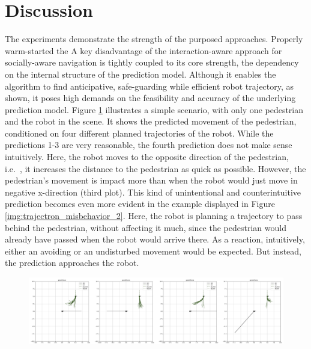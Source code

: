 \section{Discussion}
\label{text:experiments/discussion}
The experiments demonstrate the strength of the purposed approaches. Properly warm-started the   
\newline
A key disadvantage of the interaction-aware approach for socially-aware navigation is tightly coupled to its core strength, the dependency on the internal structure of the prediction model. Although it enables the algorithm to find anticipative, safe-guarding while efficient robot trajectory, as shown, it poses high demands on the feasibility and accuracy of the underlying prediction model. Figure \ref{img:trajectron_misbehavior} illustrates a simple scenario, with only one pedestrian and the robot in the scene. It shows the predicted movement of the pedestrian, conditioned on four different planned trajectories of the robot. While the predictions 1-3 are very reasonable, the fourth prediction does not make sense intuitively. Here, the robot moves to the opposite direction of the pedestrian, i.e.\ , it increases the distance to the pedestrian as quick as possible. However, the pedestrian's movement is impact more than when the robot would just move in negative x-direction (third plot). This kind of unintentional and counterintuitive prediction becomes even more evident in the example displayed in Figure \ref{img:trajectron_misbehavior_2}. Here, the robot is planning a trajectory to pass behind the pedestrian, without affecting it much, since the pedestrian would already have passed when the robot would arrive there. As a reaction, intuitively, either an avoiding or an undisturbed movement would be expected. But instead, the prediction approaches the robot. 

\begin{figure}[!ht]
\begin{center}
\includegraphics[width=\textwidth]{images/trajectron_misbehavior.png}
\label{img:trajectron_misbehavior}
\end{center}
\end{figure}


